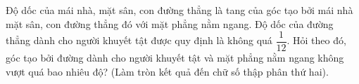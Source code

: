 \begin{bt}%

	Độ dốc của mái nhà, mặt sân, con đường thẳng là tang của góc tạo bởi mái nhà mặt sân, con đường thẳng đó với mặt phẳng nằm ngang. Độ dốc của đường thẳng dành cho người khuyết tật được quy định là không quá $\dfrac{1}{12}$. Hỏi theo đó, góc tạo bởi đường dành cho người khuyết tật và mặt phẳng nằm ngang không vượt quá bao nhiêu độ? (Làm tròn kết quả đến chữ số thập phân thứ hai).
\end{bt}

